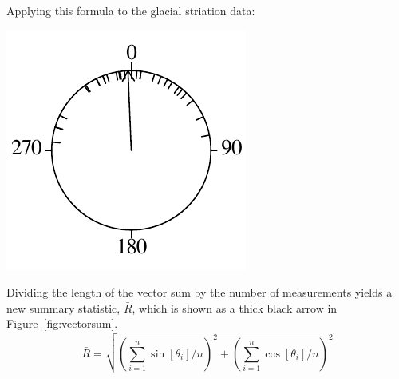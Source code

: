 Applying this formula to the glacial striation data:

\noindent\begin{minipage}[t][][b]{.25\textwidth}
\includegraphics[width=\textwidth]{../figures/circle3.pdf}\medskip
\end{minipage}
\begin{minipage}[t][][t]{.75\textwidth}
  \label{fig:circle3}
\end{minipage}

Dividing the length of the vector sum by the number of measurements
yields a new summary statistic, $\bar{R}$, which is shown as a thick
black arrow in Figure~\ref{fig:vectorsum}.
\begin{equation}
  \bar{R} = \sqrt{\left(\sum_{i=1}^{n} \sin[\theta_i]/n\right)^2 +
    \left( \sum_{i=1}^{n}\cos[\theta_i]/n \right)^2}
  \label{eq:circularR}
\end{equation}

